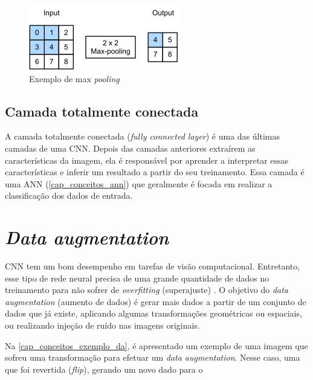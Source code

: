 \begin{figure}[htb]
	\caption {\label{exemplo_pooling} Exemplo de max \textit{pooling}}
	\begin{center}
		\includegraphics[scale=1.0]{Imagens/maxpooling}
	\end{center}
\end{figure}

\subsection{Camada totalmente conectada}\label{cap_conceitos_cnn_totalmente}
A camada totalmente conectada (\textit{fully connected layer}) é uma das últimas camadas de uma CNN.
Depois das camadas anteriores extraírem as características da imagem, ela é responsável por
aprender a interpretar essas características e inferir um resultado a partir do seu treinamento.
Essa camada é uma ANN (\autoref{cap_conceitos_ann}) que geralmente é focada em realizar a classificação dos dados
de entrada.

\section{\textit{Data augmentation}}\label{cap_conceitos_data_augmentation}
CNN tem um bom desempenho em tarefas de visão computacional. Entretanto, esse tipo de rede neural precisa de uma
grande quantidade de dados no treinamento para não sofrer de \textit{overfitting} (superajuste)
\cite{shorten2019survey}.
O objetivo do \textit{data augmentation} (aumento de dados) é gerar mais dados a partir de um conjunto de dados
que já existe, aplicando algumas transformações geométricas ou espaciais, ou realizando injeção de ruído nas imagens
originais.

Na \autoref{cap_conceitos_exemplo_da}, é apresentado um exemplo de uma imagem que sofreu uma transformação para efetuar
um \textit{data augmentation}.
Nesse caso, uma que foi revertida (\textit{flip}), gerando um novo dado para o 

